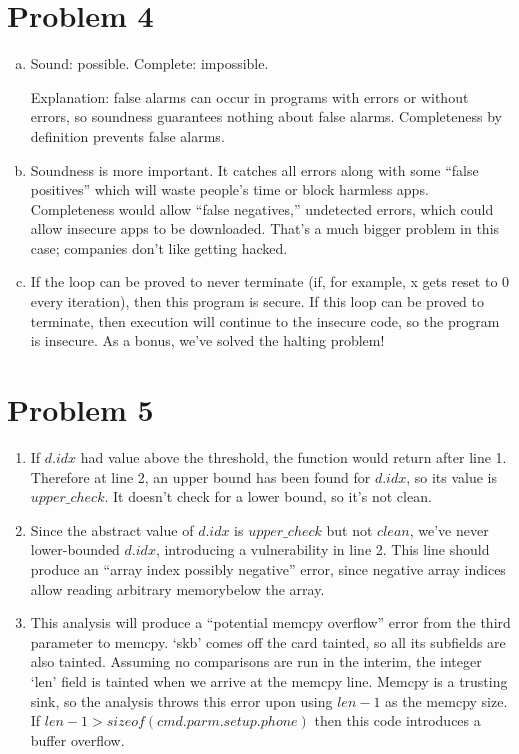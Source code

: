 \documentclass{article}
\begin{document}
\newpage
\section*{Problem 4}

\begin{enumerate}[a.]
\item Sound: possible. Complete: impossible.

Explanation: false alarms can occur in programs with errors or without errors, so soundness guarantees nothing about false alarms. Completeness by definition prevents false alarms.

\item Soundness is more important. It catches all errors along with some ``false positives'' which will waste people's time or block harmless apps. Completeness would allow ``false negatives,'' undetected errors, which could allow insecure apps to be downloaded. That's a much bigger problem in this case; companies don't like getting hacked.
\item If the loop can be proved to never terminate (if, for example, x gets reset to 0 every iteration), then this program is secure. If this loop can be proved to terminate, then execution will continue to the insecure code, so the program is insecure. As a bonus, we've solved the halting problem!
\end{enumerate}

\newpage
\section*{Problem 5}
\begin{enumerate}
\item If $d.idx$ had value above the threshold, the function would return after line 1. Therefore at line 2, an upper bound has been found for $d.idx$, so its value is $upper\_check$. It doesn't check for a lower bound, so it's not clean.
\item Since the abstract value of $d.idx$ is $upper\_check$ but not $clean$, we've never lower-bounded $d.idx$, introducing a vulnerability in line 2. This line should produce an ``array index possibly negative'' error, since negative array indices allow reading arbitrary memorybelow the array.
\item This analysis will produce a ``potential memcpy overflow'' error from the third parameter to memcpy. `skb' comes off the card tainted, so all its subfields are also tainted. Assuming no comparisons are run in the interim, the integer `len' field is tainted when we arrive at the memcpy line. Memcpy is a trusting sink, so the analysis throws this error upon using $len - 1$ as the memcpy size. If $len - 1 > sizeof(cmd.parm.setup.phone)$ then this code introduces a buffer overflow.
\end{enumerate}
\end{document}
